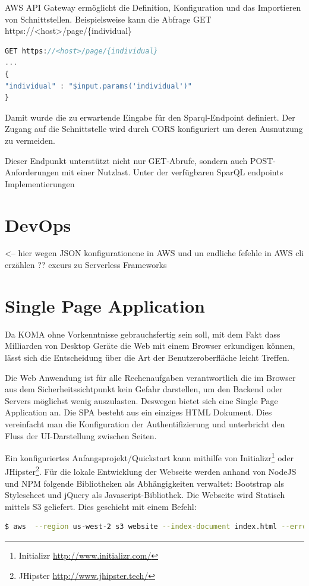 \documentclass[
12pt,
english,
ngerman,
headsepline,
twoside,
openright,
numbers=noenddot,version=first
]{scrreprt}
\begin{document}
AWS API Gateway ermöglicht die Definition, Konfiguration und das Importieren von Schnittstellen. Beispielsweise kann die Abfrage GET https://<host>/page/\{individual\} 

\begin{lstlisting}[language=Javascript,caption={Mapping Template},label={lst:map-template}]
GET https://<host>/page/{individual} 
...
{
"individual" : "$input.params('individual')"
}
\end{lstlisting}

Damit wurde die zu erwartende Eingabe für den Sparql-Endpoint definiert. Der Zugang auf die Schnittstelle wird durch CORS konfiguriert um deren Ausnutzung zu vermeiden. 

Dieser Endpunkt unterstützt nicht nur GET-Abrufe, sondern auch POST-Anforderungen mit einer Nutzlast.
Unter der verfügbaren SparQL endpoints Implementierungen




\section{DevOps}
<-- hier wegen JSON konfigurationene in AWS und un endliche fefehle in AWS cli erzählen ?? 
excurs zu Serverless Frameworks 

\section{Single Page Application}

Da KOMA ohne Vorkenntnisse gebrauchsfertig sein soll, mit dem Fakt dass Milliarden von Desktop Geräte die Web mit einem Browser erkundigen können, lässt sich die Entscheidung über die Art der Benutzeroberfläche leicht Treffen.

Die Web Anwendung ist für alle Rechenaufgaben verantwortlich die im Browser aus dem Sicherheitssichtpunkt kein Gefahr darstellen, um den Backend oder Servers möglichst wenig auszulasten. Deswegen bietet sich eine Single Page Application an. 
Die SPA besteht aus ein einziges HTML Dokument. Dies vereinfacht man die Konfiguration der Authentifizierung und unterbricht den Fluss der UI-Darstellung zwischen Seiten.

Ein konfiguriertes Anfangsprojekt/Quickstart kann mithilfe von Initializr\footnote{Initializr \url{http://www.initializr.com/}} oder JHipster\footnote{JHipster \url{http://www.jhipster.tech/}}. Für die lokale Entwicklung der Webseite werden anhand von NodeJS und NPM folgende Bibliotheken als Abhängigkeiten verwaltet: Bootstrap als Stylescheet und jQuery als Javascript-Bibliothek.
Die Webseite wird Statisch mittels S3 geliefert. Dies geschieht mit einem Befehl: 
\begin{lstlisting}[language=BASH, caption={Webseite veröffentlichen}]
$ aws  --region us-west-2 s3 website --index-document index.html --error-document error.html 's3://koma.thb.de'
\end{lstlisting} 
\end{document}
